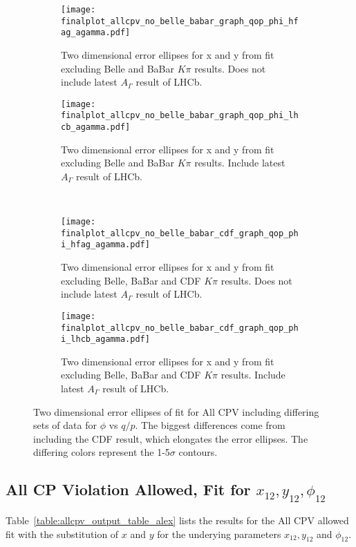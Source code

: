 \begin{figure}[tb]
  \begin{center}
    \begin{subfigure}[b]{0.4\textwidth}
      \centering
      \texttt{[image: finalplot\_allcpv\_no\_belle\_babar\_graph\_qop\_phi\_hfag\_agamma.pdf]}
      \caption{Two dimensional error ellipses for x and y from fit excluding Belle and BaBar $K\pi$ results. Does not include latest $A_\Gamma$ result of LHCb.}
      \label{fig:xy_all_cpv_no_agamma}
    \end{subfigure}%
    \hspace{2mm}
    \begin{subfigure}[b]{0.4\textwidth}
      \centering
      \texttt{[image: finalplot\_allcpv\_no\_belle\_babar\_graph\_qop\_phi\_lhcb\_agamma.pdf]}
      \caption{Two dimensional error ellipses for x and y from fit excluding Belle and BaBar $K\pi$ results. Include latest $A_\Gamma$ result of LHCb.}
      \label{fig:xy_all_cpv_with_agamma}
    \end{subfigure}%
        \\
    \begin{subfigure}[b]{0.4\textwidth}
      \centering
      \texttt{[image: finalplot\_allcpv\_no\_belle\_babar\_cdf\_graph\_qop\_phi\_hfag\_agamma.pdf]}
      \caption{Two dimensional error ellipses for x and y from fit excluding Belle, BaBar and CDF $K\pi$ results. Does not include latest $A_\Gamma$ result of LHCb.}
      \label{fig:xy_all_cpv_no_agamma}
    \end{subfigure}%
    \hspace{2mm}
    \begin{subfigure}[b]{0.4\textwidth}
      \centering
      \texttt{[image: finalplot\_allcpv\_no\_belle\_babar\_cdf\_graph\_qop\_phi\_lhcb\_agamma.pdf]}
      \caption{Two dimensional error ellipses for x and y from fit excluding Belle, BaBar and CDF $K\pi$ results. Include latest $A_\Gamma$ result of LHCb.}
      \label{fig:xy_all_cpv_with_agamma}
    \end{subfigure}%
  \end{center}
  \caption{Two dimensional error ellipses of fit for All CPV including differing sets of data for $\phi$ vs $q/p$. The biggest differences come from including the CDF result, which elongates the error ellipses. The differing colors represent the 1-5$\sigma$ contours.}
  \label{fig:xy_all_variations}
\end{figure}

\subsection{All CP Violation Allowed, Fit for $x_{12},y_{12},\phi_{12}$}
Table~\ref{table:allcpv_output_table_alex} lists the results for the All CPV allowed fit with the substitution of $x$ and $y$ for the underying parameters $x_{12},y_{12}$ and $\phi_{12}$. 

